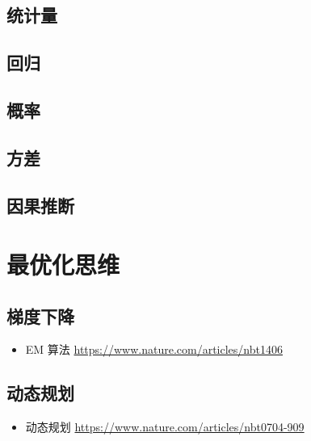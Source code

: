 \documentclass[]{tufte-book}
\providecommand{\tightlist}{%
  \setlength{\itemsep}{0pt}\setlength{\parskip}{0pt}}
\begin{document}
\hypertarget{ux7edfux8ba1ux91cf}{%
\subsection{统计量}\label{ux7edfux8ba1ux91cf}}

\hypertarget{ux56deux5f52}{%
\subsection{回归}\label{ux56deux5f52}}

\hypertarget{ux6982ux7387}{%
\subsection{概率}\label{ux6982ux7387}}

\hypertarget{ux65b9ux5dee}{%
\subsection{方差}\label{ux65b9ux5dee}}

\hypertarget{ux56e0ux679cux63a8ux65ad}{%
\subsection{因果推断}\label{ux56e0ux679cux63a8ux65ad}}

\hypertarget{ux6700ux4f18ux5316ux601dux7ef4}{%
\section{最优化思维}\label{ux6700ux4f18ux5316ux601dux7ef4}}

\hypertarget{ux68afux5ea6ux4e0bux964d}{%
\subsection{梯度下降}\label{ux68afux5ea6ux4e0bux964d}}

\begin{itemize}
\tightlist
\item
  EM 算法 \url{https://www.nature.com/articles/nbt1406}
\end{itemize}

\hypertarget{ux52a8ux6001ux89c4ux5212}{%
\subsection{动态规划}\label{ux52a8ux6001ux89c4ux5212}}

\begin{itemize}
\tightlist
\item
  动态规划 \url{https://www.nature.com/articles/nbt0704-909}
\end{itemize}
\end{document}
